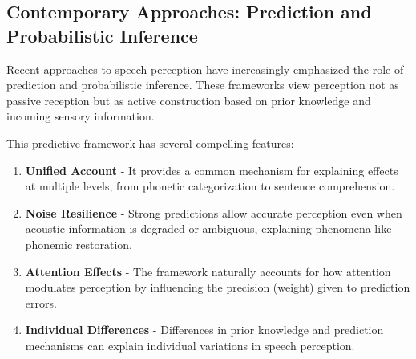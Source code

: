 \documentclass[12pt,a4paper]{article}
\begin{document}
\subsection{Contemporary Approaches: Prediction and Probabilistic Inference}

Recent approaches to speech perception have increasingly emphasized the role of prediction and probabilistic inference. These frameworks view perception not as passive reception but as active construction based on prior knowledge and incoming sensory information.

\begin{tcolorbox}[enhanced, colback=blue!5, colframe=blue!75!black, title=Predictive Processing in Speech Perception]
\end{tcolorbox}

This predictive framework has several compelling features:

\begin{enumerate}
\item \textbf{Unified Account} - It provides a common mechanism for explaining effects at multiple levels, from phonetic categorization to sentence comprehension.

\item \textbf{Noise Resilience} - Strong predictions allow accurate perception even when acoustic information is degraded or ambiguous, explaining phenomena like phonemic restoration.

\item \textbf{Attention Effects} - The framework naturally accounts for how attention modulates perception by influencing the precision (weight) given to prediction errors.

\item \textbf{Individual Differences} - Differences in prior knowledge and prediction mechanisms can explain individual variations in speech perception.
\end{enumerate}
\end{document}

